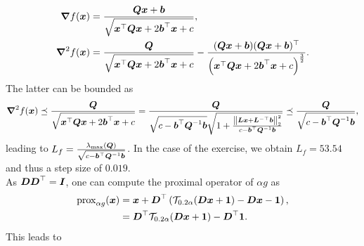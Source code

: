 \begin{align*}
\boldsymbol \nabla f(\boldsymbol x) & = \frac{\boldsymbol{Qx}+\boldsymbol b}{\sqrt{\boldsymbol x^\top \boldsymbol{Qx} + 
2 \boldsymbol b^\top \boldsymbol x + c}}, \\
\boldsymbol \nabla^2 f(\boldsymbol x) & = \frac{\boldsymbol Q}{\sqrt{\boldsymbol x^\top \boldsymbol{Qx} + 
2 \boldsymbol b^\top \boldsymbol x + c}} - \frac{(\boldsymbol{Qx}+\boldsymbol b)(\boldsymbol{Qx}+\boldsymbol b)^\top}{\left(\boldsymbol x^\top \boldsymbol{Qx} + 
2 \boldsymbol b^\top \boldsymbol x + c\right)^{\frac{3}{2}}}. 
\end{align*}
The latter can be bounded as 
\begin{align*}
	\boldsymbol \nabla^2 f(\boldsymbol x) \preceq  \frac{\boldsymbol Q }{\sqrt{\boldsymbol x^\top \boldsymbol{Qx} + 
2 \boldsymbol b^\top \boldsymbol x + c}} = \frac{\boldsymbol Q }{ \sqrt{c -\boldsymbol b^\top\boldsymbol Q^{-1} \boldsymbol b} \sqrt{1+\frac{\left \| \boldsymbol{Lx} + \boldsymbol L^{-\top} \boldsymbol b \right \|_2^2}{ c -\boldsymbol b^\top\boldsymbol Q^{-1} \boldsymbol b}}} \preceq \frac{\boldsymbol Q }{ \sqrt{c -\boldsymbol b^\top\boldsymbol Q^{-1} \boldsymbol b}},
\end{align*}
leading to $L_f = \frac{\lambda_{\text{max}}\left(\boldsymbol Q\right)}{\sqrt{c -\boldsymbol b^\top\boldsymbol Q^{-1} \boldsymbol b}}$. In the case of the exercise, we obtain $L_f = 53.54$ and thus a step size of  $0.019$. \\
As $\boldsymbol D \boldsymbol D^\top = \boldsymbol I$, one can compute the proximal operator of $\alpha g$ as 
\begin{align*}
	\operatorname{prox}_{\alpha g}(\boldsymbol x) & = \boldsymbol x + \boldsymbol D^\top \left( 
\mathcal T_{0.2\alpha} (\boldsymbol{Dx}+\boldsymbol 1) - \boldsymbol{Dx} - \boldsymbol 1 \right),\\
 & =  \boldsymbol D^\top 
\mathcal T_{0.2\alpha} (\boldsymbol{Dx}+\boldsymbol 1) -\boldsymbol D^\top \boldsymbol 1 .
\end{align*}
This leads to 
